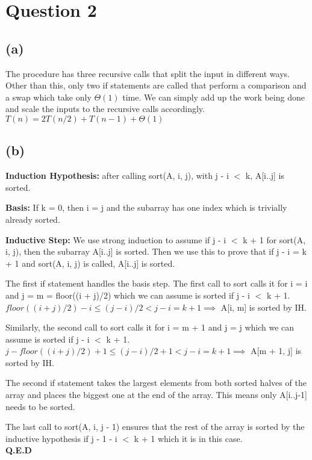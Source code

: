 \section{Question 2}
    \subsection{(a)}
    \vspace{-2mm}
    The procedure has three recursive calls that split the input in different ways. Other than this, only two if statements are called that perform a comparison and a swap which take only $\Theta(1)$ time. We can simply add up the work being done and scale the inputs to the recursive calls accordingly.
    $T(n) = 2T(n/2) + T(n - 1) + \Theta(1)$
    \vspace{-2mm}
    \subsection{(b)}
    \vspace{-2mm}
    \textbf{Induction Hypothesis:} after calling sort(A, i, j), with j - i $<$ k, A[i..j] is sorted.

    \textbf{Basis:} If k = 0, then i = j and the subarray has one index which is trivially already sorted.

    \textbf{Inductive Step:} We use strong induction to assume if j - i $<$ k + 1 for sort(A, i, j), then the subarray A[i..j] is sorted. Then we use this to prove that if j - i = k + 1 and sort(A, i, j) is called, A[i..j] is sorted.

    The first if statement handles the basis step.
    The first call to sort calls it for i = i and j = m = floor((i + j)/2) which we can assume is sorted if j - i $<$ k + 1. $floor((i + j)/2) - i \leq (j - i)/2 < j - i = k + 1 \implies $ A[i, m] is sorted by IH.
    
    Similarly, the second call to sort calls it for i = m + 1 and j = j which we can assume is sorted if j - i $<$ k + 1. $j - floor((i + j)/2) + 1 \leq (j - i)/2 + 1 < j - i = k + 1 \implies $ A[m + 1, j] is sorted by IH.

    The second if statement takes the largest elements from both sorted halves of the array and places the biggest one at the end of the array. This means only A[i..j-1] needs to be sorted.

    The last call to sort(A, i, j - 1) ensures that the rest of the array is sorted by the inductive hypothesis if j - 1 - i $<$ k + 1 which it is in this case.\\
    \textbf{Q.E.D}


